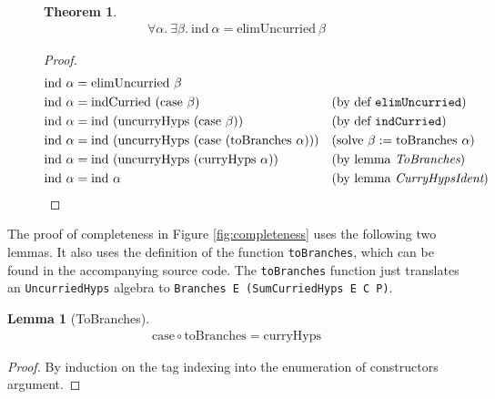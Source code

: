\documentclass[preprint,nonatbib]{sigplanconf}
\newtheorem*{mythm}{Theorem}
\newtheorem*{mylem}{Lemma}
\newcommand{\reffig}[1]{Figure \ref{fig:#1}}
\begin{document}
\begin{figure*}
\caption{Completeness of {\tt elim}}
\label{fig:completeness}
\begin{mythm}
\begin{align*}
\forall \alpha. ~ \exists \beta.
~ \textrm{ind} ~ \alpha = \textrm{elimUncurried} ~ \beta
\end{align*}
\end{mythm}

\begin{proof}
\begin{align*}
\textrm{ind} ~ \alpha &= \textrm{elimUncurried} ~ \beta& && \\
\textrm{ind} ~ \alpha &=\textrm{indCurried} ~ ( \textrm{case} ~ \beta ) && \text{(by def {\tt elimUncurried})} \notag\\
\textrm{ind} ~ \alpha &= \textrm{ind} ~ ( \textrm{uncurryHyps} ~ ( \textrm{case} ~ \beta ) ) && \text{(by def {\tt indCurried})} \notag\\
\textrm{ind} ~ \alpha &= \textrm{ind} ~ ( \textrm{uncurryHyps} ~ ( \textrm{case} ~ ( \textrm{toBranches} ~ \alpha ) ) ) && (\text{solve} ~ \beta := \textrm{toBranches} ~ \alpha) \\
\textrm{ind} ~ \alpha &= \textrm{ind} ~ ( \textrm{uncurryHyps} ~ ( \textrm{curryHyps} ~ \alpha ) ) && \text{(by lemma {\it ToBranches})} \\
\textrm{ind} ~ \alpha &= \textrm{ind} ~ \alpha && \text{(by lemma {\it CurryHypsIdent})}
\end{align*}
\end{proof}
\end{figure*}

The proof of completeness in \reffig{completeness} uses the following
two lemmas. It also uses the definition of the function
{\tt toBranches}, which can be found in the accompanying source
code. The {\tt toBranches} function just translates an
{\tt UncurriedHyps} algebra to {\tt Branches E (SumCurriedHyps E C P)}.

\begin{mylem}[ToBranches]
\begin{align*}
\textrm{case} \circ \textrm{toBranches} = \textrm{curryHyps}
\end{align*}
\end{mylem}

\begin{proof}
By induction on the tag indexing into the enumeration of constructors argument.
\end{proof}
\end{document}
